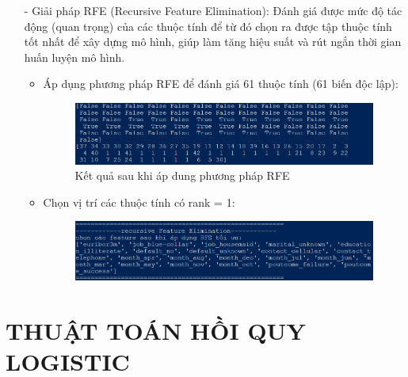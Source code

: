 \documentclass{report}
\newcommand\tab[1][1.25cm]{\hspace*{#1}}
\begin{document}
\begin{enumerate}
            \item [- ] Giải pháp RFE (Recursive Feature Elimination): Đánh giá được mức độ tác động (quan trọng) của các thuộc tính để từ đó chọn ra được tập thuộc tính tốt nhất để xây dựng mô hình, giúp làm tăng hiệu suất và rút ngắn thời gian huấn luyện mô hình.
                \begin{itemize}
                    \item Áp dụng phương pháp RFE để đánh giá 61 thuộc tính (61 biến độc lập):
                        \begin{figure}[htp]
                            \centering
                            \tab[1.25cm]\includegraphics[scale = 0.75]{image/VC_5.png}
                            \caption{Kết quả sau khi áp dung phương pháp RFE}
                        \end{figure}
                    \item Chọn vị trí các thuộc tính có rank = 1:
                        \begin{figure}[htp]
                            \centering
                            \tab[1.25cm]\includegraphics[scale = 0.75]{image/VC_6.png}
                        \end{figure}
                \end{itemize}
        \end{enumerate}
        
\pagebreak

\fontsize{18}{10}\selectfont
\chapter{THUẬT TOÁN HỒI QUY LOGISTIC}
    \fontsize{16}{10}\selectfont
\end{document}
